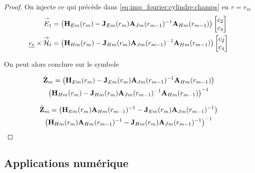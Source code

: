 \begin{proof}

            On injecte ce qui précède dans \eqref{eq:imp_fourier:cylindre:champs} en $r = r_{m}$
            \begin{align}
                {\overset{\rightarrow}{E}}_t &= 
                \left(\mathbf{H}_{Em}(r_{m}) - \mathbf{J}_{Em}(r_{m})\mathbf{A}_{Jm}(r_{m-1})^{-1}\mathbf{A}_{Hm}(r_{m-1})\right)
                \begin{bmatrix}
                    c_2 \\
                    c_4
                \end{bmatrix}
                \\
                \underline{e_r}\times{\overset{\rightarrow}{\mathcal{H}}}_t &= 
                \left(\mathbf{H}_{Hm}(r_{m}) - \mathbf{J}_{Hm}(r_{m})\mathbf{A}_{Jm}(r_{m-1})^{-1}\mathbf{A}_{Hm}(r_{m-1}) \right)
                \begin{bmatrix}
                    c_2 \\
                    c_4
                \end{bmatrix}
            \end{align}


            On peut alors conclure sur le symbole

            \begin{multline}
                \hat {\mathbf{Z}}_{m} = 
                    \left(\mathbf{H}_{Em}(r_m) - \mathbf{J}_{Em}(r_m)\mathbf{A}_{Jm}(r_{m-1})^{-1}\mathbf{A}_{Hm}(r_{m-1})\right) \\
                    \left(\mathbf{H}_{Hm}(r_m) - \mathbf{J}_{Hm}(r_m)\mathbf{A}_{Jm}(r_{m-1})^{-1}\mathbf{A}_{Hm}(r_{m-1})\right)^{-1}
            \end{multline}

            \begin{multline}
                \hat {\mathbf{Z}}_{m} =
                    \left(\mathbf{H}_{Em}(r_m)\mathbf{A}_{Hm}(r_{m-1})^{-1} - \mathbf{J}_{Em}(r_m)\mathbf{A}_{Jm}(r_{m-1})^{-1}\right) \\
                    \left(\mathbf{H}_{Hm}(r_m)\mathbf{A}_{Hm}(r_{m-1})^{-1} - \mathbf{J}_{Hm}(r_m)\mathbf{A}_{Jm}(r_{m-1})^{-1}\right)^{-1}
            \end{multline}

        \end{proof}

    \subsection{Applications numérique}

